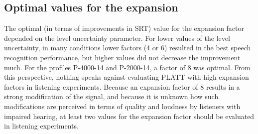 \documentclass[10pt,a4paper,twocolumn]{article}
\begin{document}
\subsection*{Optimal values for the expansion}
%
The optimal (in terms of improvements in SRT) value for the expansion factor depended on the level uncertainty parameter.
%
For lower values of the level uncertainty, in many conditions lower factors (4 or 6) resulted in the best speech recognition performance, but higher values did not decrease the improvement much.
%
For the profiles P-4000-14 and P-2000-14, a factor of 8 was optimal.
%
From this perspective, nothing speaks against evaluating PLATT with high expansion factors in listening experiments.
%
Because an expansion factor of 8 results in a strong modification of the signal, and because it is unknown how such modifications are perceived in terms of quality and loudness by listeners with impaired hearing, at least two values for the expansion factor should be evaluated in listening experiments.
\end{document}
